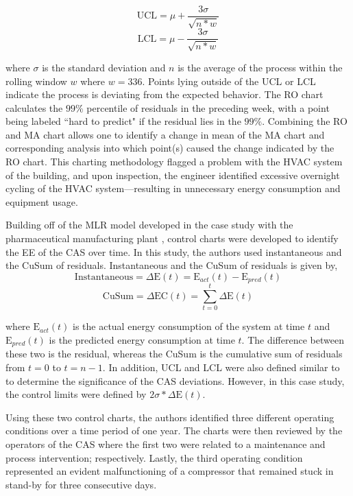 \begin{equation}
    \text{UCL} = \mu + \frac{3\sigma}{\sqrt{n * w}}
\end{equation}
\begin{equation}
    \text{LCL} = \mu - \frac{3\sigma}{\sqrt{n * w}}
\end{equation}

where $\sigma$ is the standard deviation and $n$ is the average of the process within the rolling window $w$ where $w=336$. Points lying outside of the UCL or LCL indicate the process is deviating from the expected behavior. The RO chart calculates the $99\%$ percentile of residuals in the preceding week, with a point being labeled ``hard to predict" if the residual lies in the $99\%$. Combining the RO and MA chart allows one to identify a change in mean of the MA chart and corresponding analysis into which point(s) caused the change indicated by the RO chart. This charting methodology flagged a problem with the HVAC system of the building, and upon inspection, the engineer identified excessive overnight cycling of the HVAC system—resulting in unnecessary energy consumption and equipment usage. 

Building off of the MLR model developed in the case study with the pharmaceutical manufacturing plant \cite{cas}, control charts were developed to identify the EE of the CAS over time. In this study, the authors used instantaneous and the \ac{CuSum} of residuals. Instantaneous and the CuSum of residuals is given by,
\begin{equation}
    \text{Instantaneous} = \Delta \text{E}(t) = \text{E}_{act}(t) - \text{E}_{pred}(t)
\end{equation}
\begin{equation}
    \text{CuSum} = \Delta \text{EC}(t) = \sum_{t=0}^t\Delta \text{E}(t)
\end{equation}

where $\text{E}_{act}(t)$ is the actual energy consumption of the system at time $t$ and $\text{E}_{pred}(t)$ is the predicted energy consumption at time $t$. The difference between these two is the residual, whereas the CuSum is the cumulative sum of residuals from $t=0$ to $t=n-1$. In addition, UCL and LCL were also defined similar to \cite{tightening} to determine the significance of the CAS deviations. However, in this case study, the control limits were defined by $2 \sigma * \Delta \text{E}(t)$. 

Using these two control charts, the authors identified three different operating conditions over a time period of one year. The charts were then reviewed by the operators of the CAS where the first two were related to a maintenance and process intervention; respectively. Lastly, the third operating condition represented an evident malfunctioning of a compressor that remained stuck in stand-by for three consecutive days.

